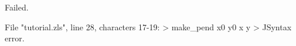 \runverbatimfalse
{}
\begin{RunVerbatimMsg}
Failed.
\end{RunVerbatimMsg}
\begin{RunVerbatimErr}
File "tutorial.zls", line 28, characters 17-19:
>    make_pend x0 y0 x y
>                 ^^
Syntax error.
\end{RunVerbatimErr}
